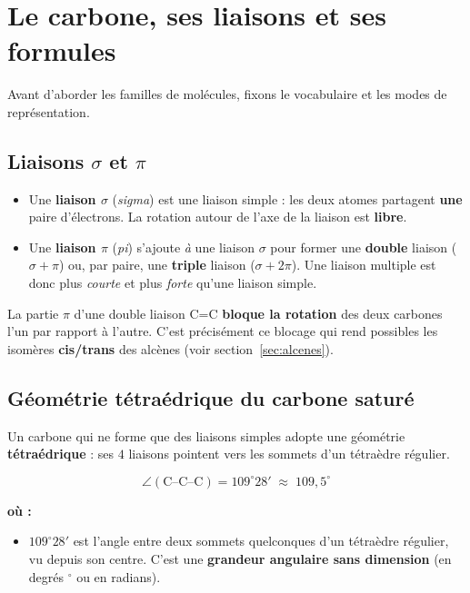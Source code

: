 \documentclass[11pt,a4paper]{article}
\providecommand{\degree}{^\circ} %
\newenvironment{ou}{%
  \par\smallskip\noindent\textbf{où :}\nopagebreak
  \begin{itemize}[leftmargin=1.8em,topsep=2pt,itemsep=1.5pt,parsep=0pt]}%
  {\end{itemize}}
\begin{document}
\section{Le carbone, ses liaisons et ses formules}
Avant d'aborder les familles de molécules, fixons le vocabulaire et les modes de représentation.

\subsection{Liaisons $\sigma$ et $\pi$}
\begin{definition}
\hfill
\begin{itemize}[leftmargin=1.6em,itemsep=1pt]
  \item Une \textbf{liaison $\sigma$} (\emph{sigma}) est une liaison simple : les deux atomes partagent \textbf{une} paire d'électrons. La rotation autour de l'axe de la liaison est \textbf{libre}.
  \item Une \textbf{liaison $\pi$} (\emph{pi}) s'ajoute \emph{à} une liaison $\sigma$ pour former une \textbf{double} liaison ($\sigma+\pi$) ou, par paire, une \textbf{triple} liaison ($\sigma+2\pi$). Une liaison multiple est donc plus \emph{courte} et plus \emph{forte} qu'une liaison simple.
\end{itemize}
\end{definition}

\begin{attention}
La partie $\pi$ d'une double liaison C=C \textbf{bloque la rotation} des deux carbones l'un par rapport à l'autre. C'est précisément ce blocage qui rend possibles les isomères \textbf{cis/trans} des alcènes (voir section~\ref{sec:alcenes}).
\end{attention}

\subsection{Géométrie tétraédrique du carbone saturé}
Un carbone qui ne forme que des liaisons simples adopte une géométrie \textbf{tétraédrique} : ses $4$ liaisons pointent vers les sommets d'un tétraèdre régulier.

\begin{formule}
\[
\angle(\text{C--C--C}) = 109\degree28' \;\approx\; 109{,}5\degree
\]
\begin{ou}
  \item $109\degree28'$ est l'angle entre deux sommets quelconques d'un tétraèdre régulier, vu depuis son centre. C'est une \textbf{grandeur angulaire sans dimension} (en degrés $\degree$ ou en radians).
\end{ou}
\end{formule}
\end{document}
